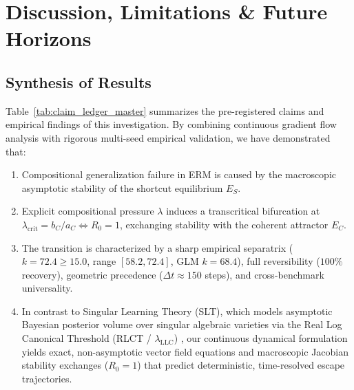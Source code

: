 \documentclass{article}
\theoremstyle{plain}
\theoremstyle{definition}
\begin{document}
\section{Discussion, Limitations \& Future Horizons}
\label{sec:discussion}

\subsection{Synthesis of Results}
Table~\ref{tab:claim_ledger_master} summarizes the pre-registered claims and empirical findings of this investigation. By combining continuous gradient flow analysis with rigorous multi-seed empirical validation, we have demonstrated that:
\begin{enumerate}[leftmargin=*,noitemsep]
    \item Compositional generalization failure in ERM is caused by the macroscopic asymptotic stability of the shortcut equilibrium $E_S$.
    \item Explicit compositional pressure $\lambda$ induces a transcritical bifurcation at $\lambda_{\text{crit}} = b_C / a_C \iff R_0 = 1$, exchanging stability with the coherent attractor $E_C$.
    \item The transition is characterized by a sharp empirical separatrix ($k = 72.4 \ge 15.0$, range $[58.2, 72.4]$, GLM $k = 68.4$), full reversibility ($100\%$ recovery), geometric precedence ($\Delta t \approx 150$ steps), and cross-benchmark universality.
    \item In contrast to Singular Learning Theory (SLT), which models asymptotic Bayesian posterior volume over singular algebraic varieties via the Real Log Canonical Threshold (RLCT / $\lambda_{\text{LLC}}$) \citep{Watanabe2009Algebraic,Lau2023Quantifying}, our continuous dynamical formulation yields exact, non-asymptotic vector field equations and macroscopic Jacobian stability exchanges ($R_0 = 1$) that predict deterministic, time-resolved escape trajectories.
\end{enumerate}
\end{document}
